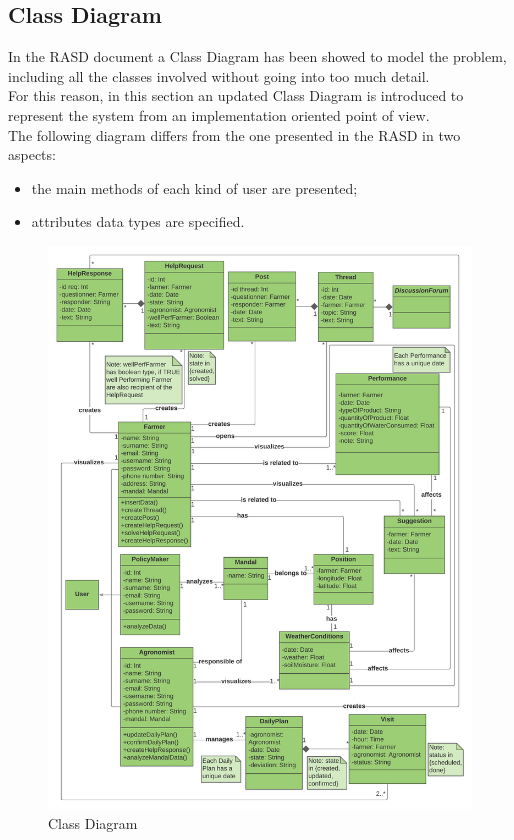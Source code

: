 \subsection{Class Diagram}
In the RASD document a Class Diagram has been showed to model the problem, including all the classes involved without going into too much detail.\\
For this reason, in this section an updated Class Diagram is introduced to represent the system from an  implementation oriented point of view. \\

The following diagram differs from the one presented in the RASD in two aspects:
\begin{itemize}
    \item the main methods of each kind of user are presented;
    \item attributes data types are specified.
\end{itemize}

\begin{figure}[H]
  \includegraphics[width=128.5mm,scale=0.9]{./Images/Class Diagram.png}
  \caption{Class Diagram}
\end{figure}